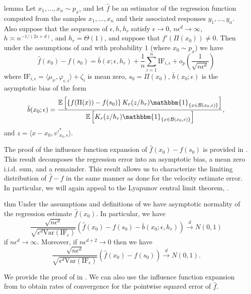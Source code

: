 \documentclass[11pt]{article}
\begin{document}
\begin{restatable}{lemma}{} \label{thm: regression ptwise decomp}
    Let $x_1, \dots, x_n \sim p_x$, and let $\hat{f}$ be an estimator of the regression function computed from the samples $x_1, \dots, x_n$ and their associated responses $y_1, \dots, y_n$. Also suppose that the sequences of $\epsilon, h, h_r$ satisfy $\epsilon \rightarrow 0$, $n\epsilon^d \rightarrow \infty$, $h\asymp n^{-1/(2s+d)}$, and $h_r = \Theta(1)$, and suppose that $f'(\Pi(x_0)) \neq 0$. Then under the assumptions of  and with probability $1$ (where $x_0 \sim p_x$)  we have
    \begin{equation*}
    \hat{f}(x_0) - f(s_0) = \bar{b}(x; \epsilon, h_r) + \frac{1}{n}\sum_{i = 1}^n\text{IF}_{i, \epsilon} + o_p\left(\frac{1}{\sqrt{n\epsilon^d}}\right)
    \end{equation*}
    where $\text{IF}_{i, \epsilon} = \langle \mu_{\psi}, \varphi_{\epsilon, i}\rangle + \zeta_i$ is mean zero, $s_0 = \Pi(x_0)$, $\bar{b}(x_0;\epsilon)$ is the asymptotic bias of the form
    \begin{equation*}
        \bar{b}(x_0; \epsilon) = \frac{\mathbb{E}\left[\left\{f(\Pi(x)) - f(s_0)\right\}K_r(z/h_r)\mathbbm{1}_{\{x\in \mathcal{B}(x_0, \epsilon)\}}\right]}{\mathbb{E}\left[K_r(z/h_r)\mathbbm{1}_{\{x\in \mathcal{B}(x_0, \epsilon)\}}\right]},
    \end{equation*}
    and $z = \langle x - x_0, v'^*_{x_0, \epsilon}\rangle$.
\end{restatable}
The proof of the influence function expansion of $\hat{f}(x_0) - f(s_0)$ is provided in . This result decomposes the regression error into an asymptotic bias, a mean zero i.i.d. sum, and a remainder. This result allows us to characterize the limiting distribution of $\hat{f} - f$ in the same manner as done for the velocity estimate error. In particular, we will again appeal to the Lyapunov central limit theorem, . 

\begin{restatable}{thm}{} \label{corr: central limit for f}
    Under the assumptions and definitions of  we have asymptotic normality of the regression estimate $\hat f(x_0)$. In particular, we have 
    \[\frac{\sqrt{n\epsilon^d}}{\sqrt{\epsilon^d\text{Var}(\text{IF}_{\epsilon})}}\left(\hat{f}(x_0) - f(s_0) - \bar{b}(x_0; \epsilon, h_r)\right) \overset{d}\rightarrow N(0, 1)\]
    if $n\epsilon^d \rightarrow \infty$. Moreover, if $n\epsilon^{d+2} \rightarrow 0$ then we have
    \[\frac{\sqrt{n\epsilon^d}}{\sqrt{\epsilon^d\text{Var}(\text{IF}_{\epsilon})}}\left(\hat{f}(x_0) - f(s_0)\right) \overset{d}\rightarrow N(0, 1).\]
\end{restatable}
We provide the proof of  in . We can also use the influence function expansion from  to obtain rates of convergence for the pointwise squared error of $\hat f$. 
\end{document}
